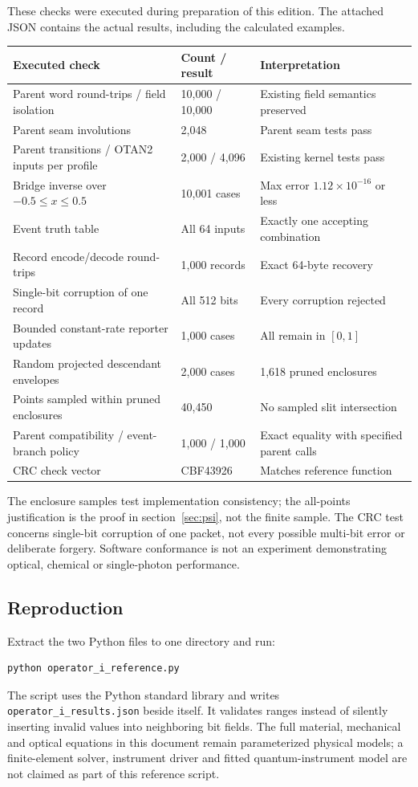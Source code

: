 \documentclass[10pt,a4paper]{article}
\numberwithin{equation}{section}
\begin{document}
These checks were executed during preparation of this edition. The attached JSON contains the actual results, including the calculated examples.

\small
\begin{tabularx}{\linewidth}{@{}Y P{31mm}P{35mm}@{}}
\toprule
\textbf{Executed check} & \textbf{Count / result} & \textbf{Interpretation}\\
\midrule
Parent word round-trips / field isolation & 10,000 / 10,000 & Existing field semantics preserved\\
Parent seam involutions & 2,048 & Parent seam tests pass\\
Parent transitions / OTAN2 inputs per profile & 2,000 / 4,096 & Existing kernel tests pass\\
Bridge inverse over $-0.5\le x\le0.5$ & 10,001 cases & Max error $1.12\times10^{-16}$ or less\\
Event truth table & All 64 inputs & Exactly one accepting combination\\
Record encode/decode round-trips & 1,000 records & Exact 64-byte recovery\\
Single-bit corruption of one record & All 512 bits & Every corruption rejected\\
Bounded constant-rate reporter updates & 1,000 cases & All remain in $[0,1]$\\
Random projected descendant envelopes & 2,000 cases & 1,618 pruned enclosures\\
Points sampled within pruned enclosures & 40,450 & No sampled slit intersection\\
Parent compatibility / event-branch policy & 1,000 / 1,000 & Exact equality with specified parent calls\\
CRC check vector & CBF43926 & Matches reference function\\
\bottomrule
\end{tabularx}
\normalsize

The enclosure samples test implementation consistency; the all-points justification is the proof in section~\ref{sec:psi}, not the finite sample. The CRC test concerns single-bit corruption of one packet, not every possible multi-bit error or deliberate forgery. Software conformance is not an experiment demonstrating optical, chemical or single-photon performance.

\subsection*{Reproduction}
Extract the two Python files to one directory and run:
\begin{lstlisting}
python operator_i_reference.py
\end{lstlisting}
The script uses the Python standard library and writes \texttt{operator\_i\_results.json} beside itself. It validates ranges instead of silently inserting invalid values into neighboring bit fields. The full material, mechanical and optical equations in this document remain parameterized physical models; a finite-element solver, instrument driver and fitted quantum-instrument model are not claimed as part of this reference script.
\end{document}
